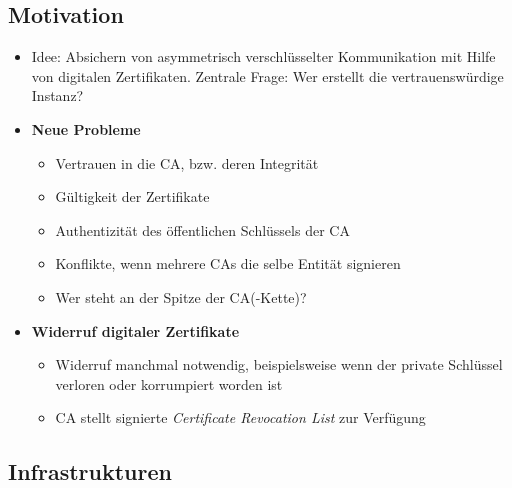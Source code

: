 \subsection{Motivation}
\begin{itemize}
	\item Idee: Absichern von asymmetrisch verschlüsselter Kommunikation mit Hilfe von digitalen Zertifikaten. Zentrale Frage: Wer erstellt die vertrauenswürdige Instanz?
	\item \textbf{Neue Probleme}
	\begin{itemize}
		\item Vertrauen in die CA, bzw. deren Integrität
		\item Gültigkeit der Zertifikate
		\item Authentizität des öffentlichen Schlüssels der CA
		\item Konflikte, wenn mehrere CAs die selbe Entität signieren
		\item Wer steht an der Spitze der CA(-Kette)?
	\end{itemize}
	\item \textbf{Widerruf digitaler Zertifikate}
	\begin{itemize}
		\item Widerruf manchmal notwendig, beispielsweise wenn der private Schlüssel verloren oder korrumpiert worden ist
		\item CA stellt signierte \textit{Certificate Revocation List} zur Verfügung
	\end{itemize}
\end{itemize}


\subsection{Infrastrukturen}

